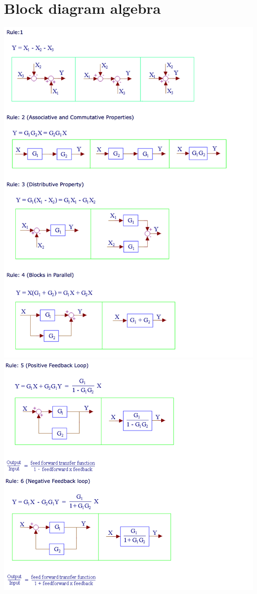 \documentclass[11pt]{book}
\begin{document}
\section{Block diagram algebra}
\includegraphics[width = \textwidth]{figures/16.04.png}
\newpage
\includegraphics[width = \textwidth]{figures/16.05.png}
\end{document}
